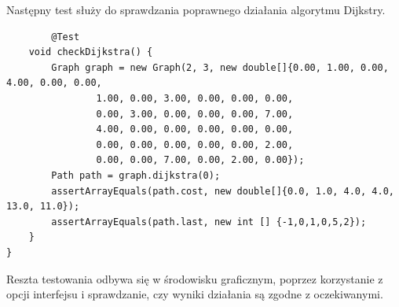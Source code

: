 \documentclass[]{article}
\begin{document}
Następny test służy do sprawdzania poprawnego działania algorytmu Dijkstry.
\begin{verbatim}
        @Test
    void checkDijkstra() {
        Graph graph = new Graph(2, 3, new double[]{0.00, 1.00, 0.00, 4.00, 0.00, 0.00,
                1.00, 0.00, 3.00, 0.00, 0.00, 0.00,
                0.00, 3.00, 0.00, 0.00, 0.00, 7.00,
                4.00, 0.00, 0.00, 0.00, 0.00, 0.00,
                0.00, 0.00, 0.00, 0.00, 0.00, 2.00,
                0.00, 0.00, 7.00, 0.00, 2.00, 0.00});
        Path path = graph.dijkstra(0);
        assertArrayEquals(path.cost, new double[]{0.0, 1.0, 4.0, 4.0, 13.0, 11.0});
        assertArrayEquals(path.last, new int [] {-1,0,1,0,5,2});
    }
}
\end{verbatim}
Reszta testowania odbywa się w środowisku graficznym, poprzez korzystanie z opcji interfejsu i sprawdzanie, czy wyniki działania są zgodne z oczekiwanymi.
\end{document}
